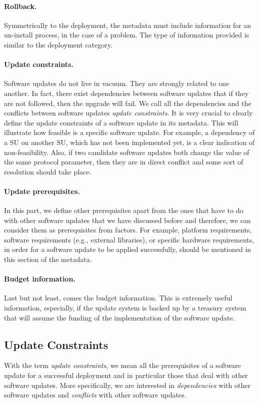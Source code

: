 \paragraph{Rollback.} Symmetrically to the deployment, the metadata must include information for an un-install process, in the case of a problem. The type of information provided is similar to the deployment category.
\paragraph{Update constraints.} Software updates do not live in vacuum. They are strongly related to one another. In fact, there exist dependencies between software updates that if they are not followed, then the upgrade will fail. We call all the dependencies and the conflicts between software updates \emph{update constraints}. It is very crucial to clearly define the update constraints of a software update in its metadata. This will illustrate how feasible is a specific software update. For example, a dependency of a SU on another SU, which has not been implemented yet, is a clear indication of non-feasibility. Also, if two candidate software updates both change the value of the same protocol parameter, then they are in direct conflict and some sort of resolution should take place.
\paragraph{Update prerequisites.} In this part, we define other prerequisites apart from the ones that have to do with other software updates that we have discussed before and therefore, we can consider them as prerequisites from  factors. For example, platform requirements, software requirements (e.g., external libraries), or specific hardware requirements, in order for a software update to be applied successfully, should be mentioned in this section of the metadata.
\paragraph{Budget information.} Last but not least, comes the budget information. This is extremely useful information, especially, if the update system is backed up by a treasury system \cite{treasury} that will assume the funding of the implementation of the software update.

\subsection{Update Constraints} \label{appdxupdcons}
With the term \emph{update constraints}, we mean all the prerequisites of a software update for a successful deployment and in particular those that deal with other software updates. 
More specifically, we are interested in \emph{dependencies} with other software updates and \emph{conflicts} with other software updates. 

